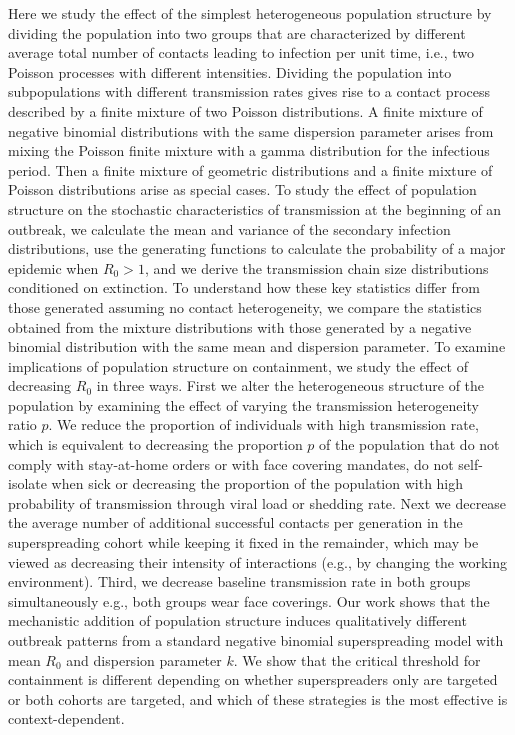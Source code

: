 \documentclass{imammb}
\numberwithin{equation}{section}
\begin{document}
Here we study the effect of the simplest heterogeneous population structure by dividing the population into two groups that are characterized by different average total number of contacts leading to infection per unit time, i.e., two Poisson processes with different intensities. Dividing the population into subpopulations with different transmission rates gives rise to a contact process described by a finite mixture of two Poisson distributions. A finite mixture of negative binomial distributions with the same dispersion parameter arises from mixing the Poisson finite mixture with a gamma distribution for the infectious period. Then a finite mixture of geometric distributions and a finite mixture of Poisson distributions arise as special cases.  To study the effect of population structure on the stochastic characteristics of transmission at the beginning of an outbreak, we calculate the mean and variance of the secondary infection distributions, use the generating functions to calculate the probability of a major epidemic when $R_0>1$, and we derive the transmission chain size distributions conditioned on extinction. To understand how these key statistics differ from those generated assuming no contact heterogeneity, we compare the statistics obtained from the mixture distributions with those generated by a negative binomial distribution with the same mean and dispersion parameter.  To examine implications of population structure on containment, we study the effect of decreasing $R_0$ in three ways. First we alter the heterogeneous structure of the population by examining the effect of varying the transmission heterogeneity ratio $p$. We reduce the proportion of individuals with high transmission rate, which is equivalent to decreasing the proportion $p$ of the population that do not comply with stay-at-home orders or with face covering mandates, do not self-isolate when sick or decreasing the proportion of the population with high probability of transmission through viral load or shedding rate. Next we decrease the average number of additional successful contacts per generation in the superspreading cohort while keeping it fixed in the remainder, which may be viewed as decreasing their intensity of interactions (e.g., by changing the working environment). Third, we decrease baseline transmission rate in both groups simultaneously e.g., both groups wear face coverings. Our work shows that the mechanistic addition of population structure induces qualitatively different outbreak patterns from a standard negative binomial superspreading model with mean $R_0$ and dispersion parameter $k$. We show that the critical threshold for containment is different depending on whether superspreaders only are targeted or both cohorts are targeted, and which of these strategies is the most effective is context-dependent. 
\end{document}
